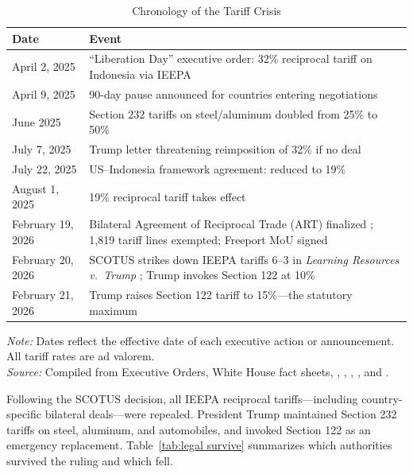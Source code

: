 \documentclass[12pt,a4paper]{article}
\begin{document}
\begin{table}[htbp]
\centering
\caption{Chronology of the Tariff Crisis}
\begin{tabularx}{\textwidth}{lX}
\toprule
\textbf{Date} & \textbf{Event} \\
\midrule
April 2, 2025 & ``Liberation Day'' executive order: 32\% reciprocal tariff on Indonesia via IEEPA \\
April 9, 2025 & 90-day pause announced for countries entering negotiations \\
June 2025 & Section 232 tariffs on steel/aluminum doubled from 25\% to 50\% \cite{crs_232} \\
July 7, 2025 & Trump letter threatening reimposition of 32\% if no deal \\
July 22, 2025 & US--Indonesia framework agreement: reduced to 19\% \\
August 1, 2025 & 19\% reciprocal tariff takes effect \\
February 19, 2026 & Bilateral Agreement of Reciprocal Trade (ART) finalized \cite{art2026}; 1,819 tariff lines exempted; Freeport MoU signed \cite{freeport_mou} \\
February 20, 2026 & SCOTUS strikes down IEEPA tariffs 6--3 in \textit{Learning Resources v.\ Trump} \cite{scotus2026}; Trump invokes Section 122 at 10\% \\
February 21, 2026 & Trump raises Section 122 tariff to 15\%---the statutory maximum \cite{s122_statute} \\
\bottomrule
\end{tabularx}
\par\smallskip
\begin{minipage}{\linewidth}
\footnotesize
\textit{Note:} Dates reflect the effective date of each executive action or announcement. All tariff rates are ad valorem.\\
\textit{Source:} Compiled from Executive Orders, White House fact sheets, \cite{scotus2026}, \cite{art2026}, \cite{freeport_mou}, \cite{crs_232}, and \cite{s122_statute}.
\end{minipage}
\label{tab:chronology}
\end{table}

Following the SCOTUS decision, all IEEPA reciprocal tariffs---including country-specific bilateral deals---were repealed. President Trump maintained Section 232 tariffs on steel, aluminum, and automobiles, and invoked Section 122 as an emergency replacement. Table~\ref{tab:legal survive} summarizes which authorities survived the ruling and which fell.
\end{document}
